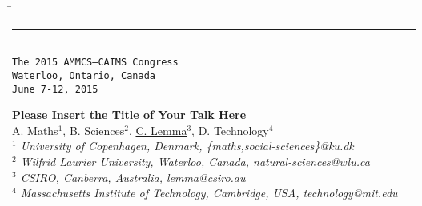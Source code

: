 \documentclass[11pt]{article}
\begin{document}
\thispagestyle{empty}
\begin{tabbing}
\hspace*{4.5in} \= {} \\[-5pt]
\rule{6.8 in}{0.01 in} \\[-2pt]
{} \> {\footnotesize\tt  The 2015 AMMCS--CAIMS Congress} \\[-5pt]
{} \> {\footnotesize\tt  Waterloo, Ontario, Canada} \\[-5pt]
{} \> {\footnotesize\tt  June 7-12, 2015}  \\[-5pt]
\end{tabbing}
%
\vspace{-0.8cm}
\begin{flushleft}
\Large \textbf{\noindent
Please Insert the Title of Your Talk Here}
\\
\vspace{0.5cm}
\normalsize
\normalsize{
 A. Maths$^1$, B. Sciences$^2$, \underline{C. Lemma}$^3$, D. Technology$^4$
} \\
\vspace{5mm}
\textit{\footnotesize
$^1$ University of Copenhagen, Denmark,
\{maths,social-sciences\}@ku.dk\\
$^2$ Wilfrid Laurier University, Waterloo, Canada,
natural-sciences@wlu.ca\\
$^3$ CSIRO, Canberra, Australia,
lemma@csiro.au\\
$^4$ Massachusetts Institute of Technology, Cambridge, USA,
technology@mit.edu\\
}
\end{flushleft}
\end{document}
